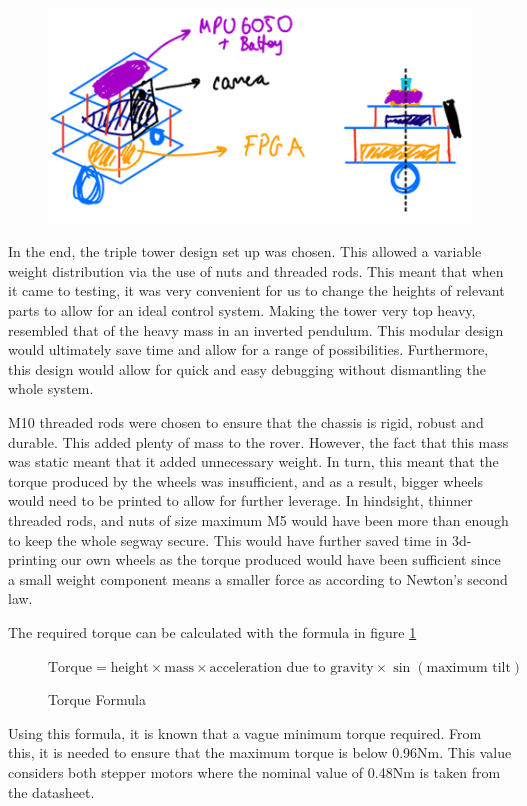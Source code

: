 \begin{figure}
    \centering
    \includegraphics[width=\linewidth]{images/chassis-drawing3.png}
    \caption{}
\end{figure}

In the end, the triple tower design set up was chosen. This allowed a variable weight distribution via the use of nuts and threaded rods. This meant that when it came to testing, it was very convenient for us to change the heights of relevant parts to allow for an ideal control system. Making the tower very top heavy, resembled that of the heavy mass in an inverted pendulum. This modular design would ultimately save time and allow for a range of possibilities. Furthermore, this design would allow for quick and easy debugging without dismantling the whole system. 

M10 threaded rods were chosen to ensure that the chassis is rigid, robust and durable. This added plenty of mass to the rover. However, the fact that this mass was static meant that it added unnecessary weight. In turn, this meant that the torque produced by the wheels was insufficient, and as a result, bigger wheels would need to be printed to allow for further leverage. In hindsight, thinner threaded rods, and nuts of size maximum M5 would have been more than enough to keep the whole segway secure. This would have further saved time in 3d-printing our own wheels as the torque produced would have been sufficient since a small weight component means a smaller force as according to Newton’s second law.

The required torque can be calculated with the formula in figure \ref{formula:torque}

\begin{figure}
    \centering
    \(\text{Torque} = \text{height} \times \text{mass} \times \text{acceleration due to gravity} \times \sin (\text{maximum tilt})\)
    \caption{Torque Formula}
    \label{formula:torque}
\end{figure}
Using this formula, it is known that a vague minimum torque required. From this, it is needed to ensure that the maximum torque is below 0.96Nm. This value considers both stepper motors where the nominal value of 0.48Nm is taken from the datasheet. 

